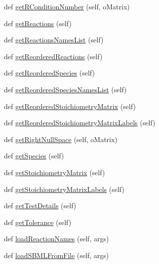 \begin{DoxyCompactItemize}
\item 
def \hyperlink{classstructural_1_1_lib_structural_ab78ce750590ca754e58a22757b86fa3e}{get\+R\+Condition\+Number} (self, o\+Matrix)
\item 
def \hyperlink{classstructural_1_1_lib_structural_a3fe3aaadcc6bd90a45573d685d06fea1}{get\+Reactions} (self)
\item 
def \hyperlink{classstructural_1_1_lib_structural_a72d431882ab21045da893c7eb0584b4f}{get\+Reactions\+Names\+List} (self)
\item 
def \hyperlink{classstructural_1_1_lib_structural_a2269e72281386e418595efc1e6d6f487}{get\+Reordered\+Reactions} (self)
\item 
def \hyperlink{classstructural_1_1_lib_structural_aee854e80be713abdc97faf014a05c657}{get\+Reordered\+Species} (self)
\item 
def \hyperlink{classstructural_1_1_lib_structural_a57ef9e5dd2df66ccd68d3cfb26a95b64}{get\+Reordered\+Species\+Names\+List} (self)
\item 
def \hyperlink{classstructural_1_1_lib_structural_a77149ff8c8ca43e5d44aef68c2a3c04b}{get\+Reordered\+Stoichiometry\+Matrix} (self)
\item 
def \hyperlink{classstructural_1_1_lib_structural_adfe96b6339b84f73dd5f4b7b6046029a}{get\+Reordered\+Stoichiometry\+Matrix\+Labels} (self)
\item 
def \hyperlink{classstructural_1_1_lib_structural_a4742b4bb4eaec3098e6f8db2cab3bae7}{get\+Right\+Null\+Space} (self, o\+Matrix)
\item 
def \hyperlink{classstructural_1_1_lib_structural_a6900b9550b40de7878afca053d97a642}{get\+Species} (self)
\item 
def \hyperlink{classstructural_1_1_lib_structural_aecba709a07e0f6b0d4cd12bdd083c301}{get\+Stoichiometry\+Matrix} (self)
\item 
def \hyperlink{classstructural_1_1_lib_structural_afa4e18f2aaaaff10cd2565bb2b3ed42b}{get\+Stoichiometry\+Matrix\+Labels} (self)
\item 
def \hyperlink{classstructural_1_1_lib_structural_ab8070d0ee245da63d79851ed4a220b41}{get\+Test\+Details} (self)
\item 
def \hyperlink{classstructural_1_1_lib_structural_a5f103742e52fe6f71aa386a62e78e6fb}{get\+Tolerance} (self)
\item 
def \hyperlink{classstructural_1_1_lib_structural_ad41f12c25df5604104064542418968d4}{load\+Reaction\+Names} (self, args)
\item 
def \hyperlink{classstructural_1_1_lib_structural_ab21b07b4f7a04e25fa9f4079284c452e}{load\+S\+B\+M\+L\+From\+File} (self, args)

\end{DoxyCompactItemize}
